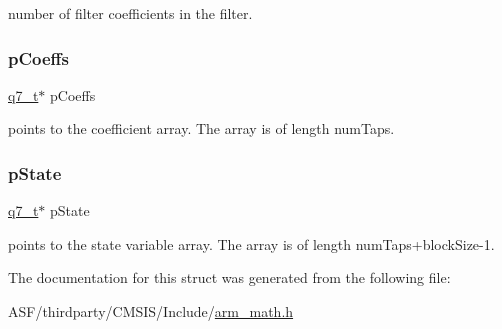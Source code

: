 number of filter coefficients in the filter. \mbox{\label{structarm__fir__instance__q7_a54407554b4fe7bbbb43924e4eea45e7f}} 
\subsubsection{\texorpdfstring{pCoeffs}{pCoeffs}}
{\footnotesize\ttfamily \mbox{\hyperlink{arm__math_8h_ae541b6f232c305361e9b416fc9eed263}{q7\+\_\+t}}$\ast$ p\+Coeffs}

points to the coefficient array. The array is of length num\+Taps. \mbox{\label{structarm__fir__instance__q7_aa8f67102521b620af6f259afdcf29785}} 
\subsubsection{\texorpdfstring{pState}{pState}}
{\footnotesize\ttfamily \mbox{\hyperlink{arm__math_8h_ae541b6f232c305361e9b416fc9eed263}{q7\+\_\+t}}$\ast$ p\+State}

points to the state variable array. The array is of length num\+Taps+block\+Size-\/1. 

The documentation for this struct was generated from the following file\+:\begin{DoxyCompactItemize}
\item 
A\+S\+F/thirdparty/\+C\+M\+S\+I\+S/\+Include/\mbox{\hyperlink{arm__math_8h}{arm\+\_\+math.\+h}}\end{DoxyCompactItemize}
